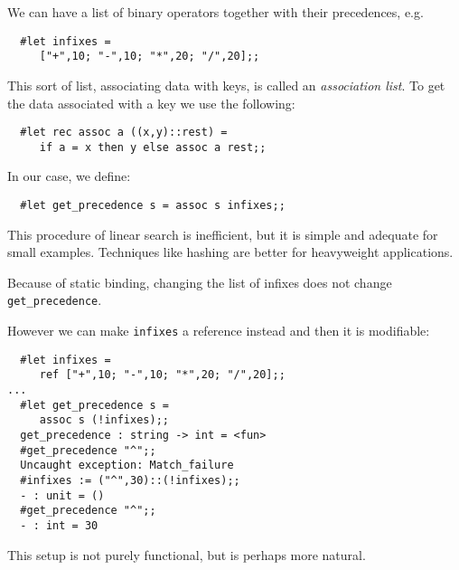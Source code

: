 \begin{slide*}


\vspace*{0.5cm}

We can have a list of binary operators together with their precedences,
e.g.

\begin{black}\begin{verbatim}
  #let infixes =
     ["+",10; "-",10; "*",20; "/",20];;
\end{verbatim}\end{black}

This sort of list, associating data with keys, is called an {\em association
list}. To get the data associated with a key we use the following:

\begin{black}\begin{verbatim}
  #let rec assoc a ((x,y)::rest) =
     if a = x then y else assoc a rest;;
\end{verbatim}\end{black}

In our case, we define:

\begin{black}\begin{verbatim}
  #let get_precedence s = assoc s infixes;;
\end{verbatim}\end{black}

This procedure of linear search is inefficient, but it is simple and adequate
for small examples. Techniques like hashing are better for heavyweight
applications.

\end{slide*}




\begin{slide*}


\vspace*{0.3cm}

Because of static binding, changing the list of infixes does not change
{\black \tt get\_precedence}.

However we can make {\black \tt infixes} a reference instead and then it is
modifiable:

\begin{black}\begin{verbatim}
  #let infixes =
     ref ["+",10; "-",10; "*",20; "/",20];;
...
  #let get_precedence s =
     assoc s (!infixes);;
  get_precedence : string -> int = <fun>
  #get_precedence "^";;
  Uncaught exception: Match_failure
  #infixes := ("^",30)::(!infixes);;
  - : unit = ()
  #get_precedence "^";;
  - : int = 30
\end{verbatim}\end{black}

This setup is not purely functional, but is perhaps more natural.

\end{slide*}






